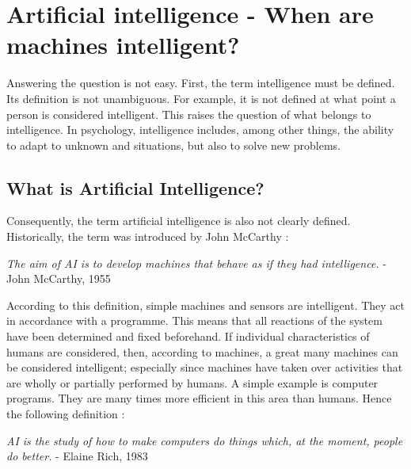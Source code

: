 %
%

% 




\chapter{Artificial intelligence - When are machines intelligent?}

Answering the question is not easy. First, the term intelligence must be defined. Its definition is not unambiguous.  For example, it is not defined at what point a person is considered intelligent. This raises the question of what belongs to intelligence. In psychology, intelligence includes, among other things, the ability to adapt to unknown and situations, but also to solve new problems.\cite{Funke:1998}


\section{What is Artificial Intelligence?}

Consequently, the term artificial intelligence is also not clearly defined. Historically, the term was introduced by John McCarthy  \cite{McCarthy:2006}:

\bigskip

\textsl{\glqq The aim of AI is to develop machines that behave as if they had intelligence.\grqq{}} - John McCarthy, 1955
	
\bigskip

According to this definition, simple machines and sensors are intelligent. They act in accordance with a programme. This means that all reactions of the system have been determined and fixed beforehand. If individual characteristics of humans are considered, then, according to machines, a great many machines can be considered intelligent; especially since machines have taken over activities that are wholly or partially performed by humans. A simple example is computer programs. They are many times more efficient in this area than humans. Hence the following definition \cite{Rich:1983}:


\bigskip

\textsl{\glqq AI is the study of how to make computers do things which, at the moment, people do better.\grqq{}} - Elaine Rich, 1983 

